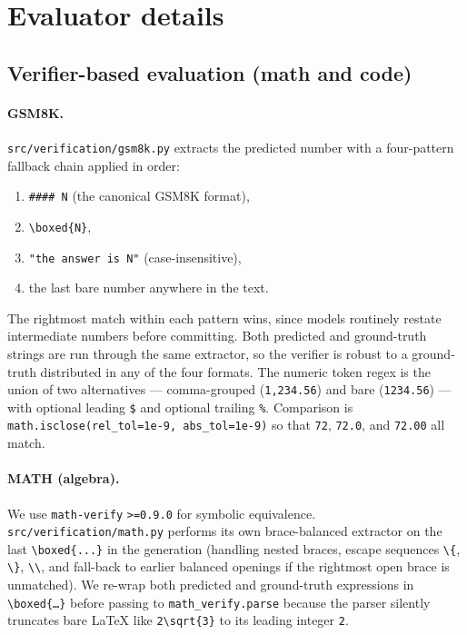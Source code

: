 \section{Evaluator details}
\label{app:evaluator}

\subsection{Verifier-based evaluation (math and code)}

\paragraph{GSM8K.}
\texttt{src/verification/gsm8k.py} extracts the predicted number with a
four-pattern fallback chain applied in order:
\begin{enumerate}
\item \texttt{\#\#\#\# N} (the canonical GSM8K format),
\item \texttt{\textbackslash boxed\{N\}},
\item \texttt{"the answer is N"} (case-insensitive),
\item the last bare number anywhere in the text.
\end{enumerate}
The rightmost match within each pattern wins, since models routinely
restate intermediate numbers before committing. Both predicted and
ground-truth strings are run through the same extractor, so the verifier
is robust to a ground-truth distributed in any of the four formats.
The numeric token regex is the union of two alternatives — comma-grouped
(\texttt{1,234.56}) and bare (\texttt{1234.56}) — with optional leading
\texttt{\$} and optional trailing \texttt{\%}. Comparison is
\texttt{math.isclose(rel\_tol=1e-9, abs\_tol=1e-9)} so that
\texttt{72}, \texttt{72.0}, and \texttt{72.00} all match.

\paragraph{MATH (algebra).}
We use \texttt{math-verify} \texttt{>=0.9.0} for symbolic equivalence.
\texttt{src/verification/math.py} performs its own brace-balanced extractor
on the last \texttt{\textbackslash boxed\{...\}} in the generation
(handling nested braces, escape sequences \texttt{\textbackslash\{},
\texttt{\textbackslash\}}, \texttt{\textbackslash\textbackslash}, and
fall-back to earlier balanced openings if the rightmost open brace is
unmatched). We re-wrap both predicted and ground-truth expressions in
\texttt{\textbackslash boxed\{\ldots\}} before passing to
\texttt{math\_verify.parse} because the parser silently truncates bare
LaTeX like \texttt{2\textbackslash sqrt\{3\}} to its leading integer
\texttt{2}.

